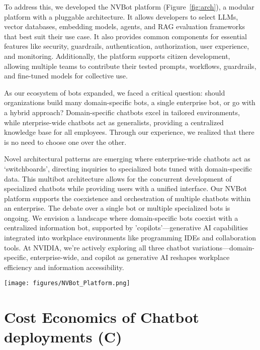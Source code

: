 \documentclass[sigconf]{acmart}
\begin{document}
To address this, we developed the NVBot platform (Figure~\ref{fig:arch}), a modular platform with a pluggable architecture. It allows developers to select LLMs, vector databases, embedding models, agents, and RAG evaluation frameworks that best suit their use case. It also provides common components for essential features like security, guardrails, authentication, authorization, user experience, and monitoring. Additionally, the platform supports citizen development, allowing multiple teams to contribute their tested prompts, workflows, guardrails, and fine-tuned models for collective use.

As our ecosystem of bots expanded, we faced a critical question: should organizations build many domain-specific bots, a single enterprise bot, or go with a hybrid approach? Domain-specific chatbots excel in tailored environments, while nterprise-wide chatbots act as generalists, providing a centralized knowledge base for all employees. Through our experience, we realized that there is no need to choose one over the other.

Novel architectural patterns are emerging where enterprise-wide chatbots act as `switchboards', directing inquiries to specialized bots tuned with domain-specific data. This multibot architecture allows for the concurrent development of specialized chatbots while providing users with a unified interface. Our NVBot platform supports the coexistence and orchestration of multiple chatbots within an enterprise. The debate over a single bot or multiple specialized bots is ongoing. We envision a landscape where domain-specific bots coexist with a centralized information bot, supported by 'copilots'—generative AI capabilities integrated into workplace environments like programming IDEs and collaboration tools. At NVIDIA, we're actively exploring all three chatbot variations—domain-specific, enterprise-wide, and copilot as generative AI reshapes workplace efficiency and information accessibility.

\begin{figure*}[ht]
    \centering
    \texttt{[image: figures/NVBot\_Platform.png]}
     \vspace{-1mm}
    \caption{Architecture of NVBot platform upon which multiple chatbots are being built.}
     \vspace{-2mm}
    \label{fig:arch}
\end{figure*}

\section {Cost Economics of Chatbot deployments (C)}
\end{document}

